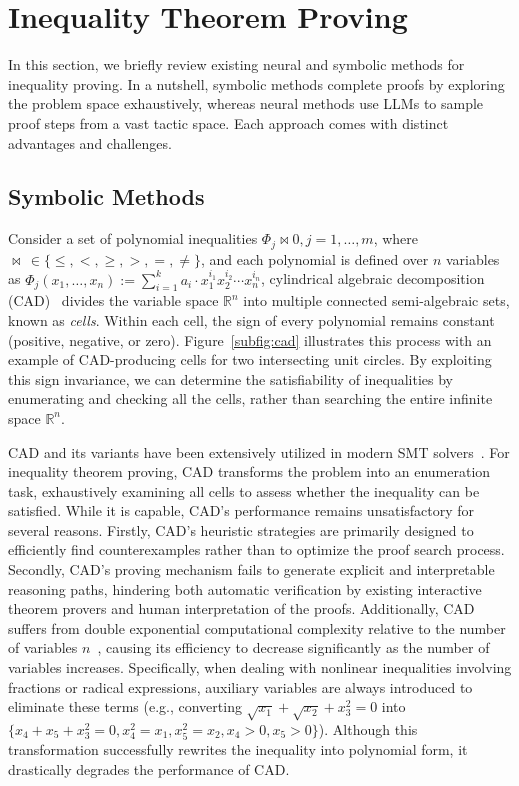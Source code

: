 \section{Inequality Theorem Proving}
\label{sec:preliminary}

In this section, we briefly review existing neural and symbolic methods for inequality proving. 
In a nutshell, 
symbolic methods complete proofs by exploring the problem space exhaustively, whereas
neural methods use LLMs to sample proof steps from a vast tactic space. Each approach comes with distinct advantages and challenges.

\vspace{-0.3em}
\subsection{Symbolic Methods}
\vspace{-0.3em}
Consider a set of polynomial inequalities $\Phi_j \bowtie 0, j=1,\dots,m$, where $\bowtie \, \in \{\leq, <, \geq, >, =, \neq\}$, 
and each polynomial is defined over $n$ variables as $\Phi_j(x_1, \dots, x_n) := \sum_{i=1}^{k} a_i \cdot x_1^{i_1} x_2^{i_2} \cdots x_n^{i_n}$, 
cylindrical algebraic decomposition (CAD)~\citep{arnon1984cylindrical, caviness2012quantifier, kremer2020cylindrical} divides the variable space $\mathbb{R}^n$ into multiple connected semi-algebraic sets, known as \emph{cells}.
Within each cell, the sign of every polynomial remains constant (positive, negative, or zero). 
Figure~\ref{subfig:cad} illustrates this process with an example of CAD-producing cells for two intersecting unit circles.
By exploiting this sign invariance, we can determine the satisfiability of inequalities by enumerating and checking all the cells, rather than searching the entire infinite space $\mathbb{R}^n$.

CAD and its variants have been extensively utilized in modern SMT solvers~\citep{jovanovic2013solving, kremer2022cooperating, uncu2023smt}. For inequality theorem proving, CAD transforms the problem into an enumeration task, exhaustively examining all cells to assess whether the inequality can be satisfied. While it is capable, CAD's performance remains unsatisfactory for several reasons. Firstly, CAD's heuristic strategies are primarily designed to efficiently find counterexamples rather than to optimize the proof search process. Secondly, CAD's proving mechanism fails to generate explicit and interpretable reasoning paths, hindering both automatic verification by existing interactive theorem provers and human interpretation of the proofs. Additionally, CAD suffers from double exponential computational complexity relative to the number of variables $n$~\citep{davenport1988real}, causing its efficiency to decrease significantly as the number of variables increases. Specifically, when dealing with nonlinear inequalities involving fractions or radical expressions, auxiliary variables are always introduced to eliminate these terms (e.g., converting $\sqrt{x_1} + \sqrt{x_2} + x_3^2 = 0$ into $\{x_4 + x_5 + x_3^2 = 0, x_4^2 = x_1, x_5^2 = x_2, x_4 > 0, x_5 > 0\}$). Although this transformation successfully rewrites the inequality into polynomial form, it drastically degrades the performance of CAD.


